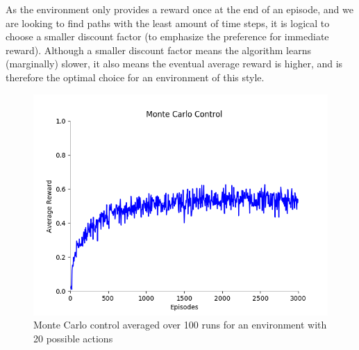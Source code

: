 As the environment only provides a reward once at the end of an episode, and we are looking to find paths with the least amount of time steps, it is logical to choose a smaller discount factor (to emphasize the preference for immediate reward). Although a smaller discount factor means the algorithm learns (marginally) slower, it also means the eventual average reward is higher, and is therefore the optimal choice for an environment of this style.
\begin{figure}[h]
\includegraphics[width=\textwidth]{resultsdiscretemc/41100runs3000normalised}
\caption[Monte Carlo Control for Discretised Environment]{Monte Carlo control averaged over 100 runs for an environment with 20 possible actions}
\label{fig:discrete}
\end{figure}

